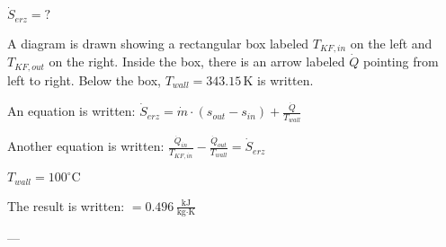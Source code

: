 \( \dot{S}_{erz} = ? \)  

A diagram is drawn showing a rectangular box labeled \( T_{KF,in} \) on the left and \( T_{KF,out} \) on the right. Inside the box, there is an arrow labeled \( \dot{Q} \) pointing from left to right. Below the box, \( T_{wall} = 343.15 \, \text{K} \) is written.  

An equation is written:  
\( \dot{S}_{erz} = \dot{m} \cdot (s_{out} - s_{in}) + \frac{\dot{Q}}{T_{wall}} \)  

Another equation is written:  
\( \frac{\dot{Q}_{in}}{T_{KF,in}} - \frac{\dot{Q}_{out}}{T_{wall}} = \dot{S}_{erz} \)  

\( T_{wall} = 100^\circ \text{C} \)  

The result is written:  
\( = 0.496 \, \frac{\text{kJ}}{\text{kg·K}} \)  

---